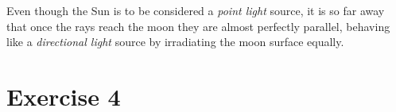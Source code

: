 \documentclass[tikz,14pt,fleqn]{article}
\begin{document}
Even though the Sun is to be considered a \textit{point light} source,
it is so far away that once the rays reach the moon they are almost perfectly parallel,
behaving like a \textit{directional light} source by irradiating the moon surface equally.\\


\section{Exercise 4}

    
    

\clearpage
\end{document}
